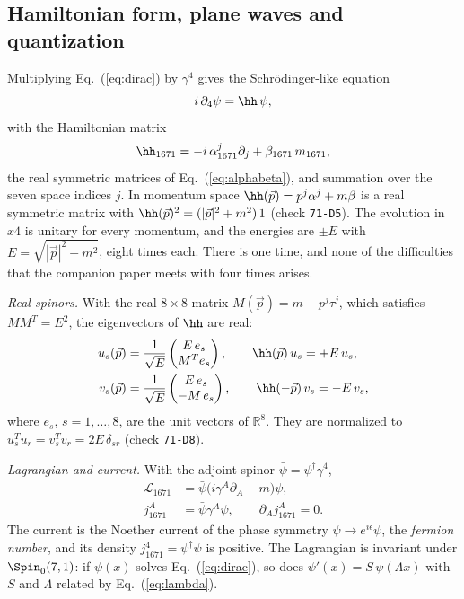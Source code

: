 \subsection{Hamiltonian form, plane waves and quantization}

Multiplying Eq.~(\ref{eq:dirac}) by $\gamma^4$ gives the Schr\"odinger-like equation
\begin{equation}
i\,\partial_4\psi=\hh\,\psi,
\label{eq:schroedinger}
\end{equation}
with the Hamiltonian matrix
\begin{equation}
\hh_{1671}=-i\,\alpha_{1671}^j\partial_j+\beta_{1671}\,m_{1671},
\label{eq:hamiltonian}
\end{equation}
the real symmetric matrices of Eq.~(\ref{eq:alphabeta}), and summation over the seven space indices
$j$. In momentum space $\hh(\vec p)=p^j\alpha^j+m\beta$ is a real symmetric matrix with
$\hh(\vec p)^2=(|\vec p|^2+m^2)\,1$ (check \texttt{71-D5}). The evolution in $x4$ is unitary for
every momentum, and the energies are $\pm E$ with $E=\sqrt{|\vec p|^2+m^2}$, eight times each. There
is one time, and none of the difficulties that the companion paper meets with four times arises.

\emph{Real spinors.} With the real $8\times8$ matrix $M(\vec p)=m+p^j\tau^j$, which satisfies
$MM^T=E^2$, the eigenvectors of $\hh$ are real:
\begin{align}
u_s(\vec p)&=\frac1{\sqrt E}\begin{pmatrix}E\,e_s\\M^Te_s\end{pmatrix},\qquad\hh(\vec p)\,u_s=+E\,u_s,\nonumber\\
v_s(\vec p)&=\frac1{\sqrt E}\begin{pmatrix}E\,e_s\\-M\,e_s\end{pmatrix},\qquad\hh(-\vec p)\,v_s=-E\,v_s,
\label{eq:spinors}
\end{align}
where $e_s$, $s=1,\dots,8$, are the unit vectors of $\mathbb{R}^8$. They are normalized to
$u_s^Tu_r=v_s^Tv_r=2E\,\delta_{sr}$ (check \texttt{71-D8}).

\emph{Lagrangian and current.} With the adjoint spinor $\bar\psi=\psi^\dagger\gamma^4$,
\begin{align}
\mathcal{L}_{1671}&=\bar\psi\big(i\gamma^A\partial_A-m\big)\psi,\nonumber\\
j_{1671}^A&=\bar\psi\gamma^A\psi,\qquad\partial_Aj^A_{1671}=0 .
\label{eq:lagrangian}
\end{align}
The current is the Noether current of the phase symmetry $\psi\to e^{i\epsilon}\psi$, the
\emph{fermion number}, and its density $j_{1671}^4=\psi^\dagger\psi$ is positive. The Lagrangian is
invariant under $\Spin_0(7,1)$: if $\psi(x)$ solves Eq.~(\ref{eq:dirac}), so does
$\psi'(x)=S\,\psi(\Lambda x)$ with $S$ and $\Lambda$ related by Eq.~(\ref{eq:lambda}).

